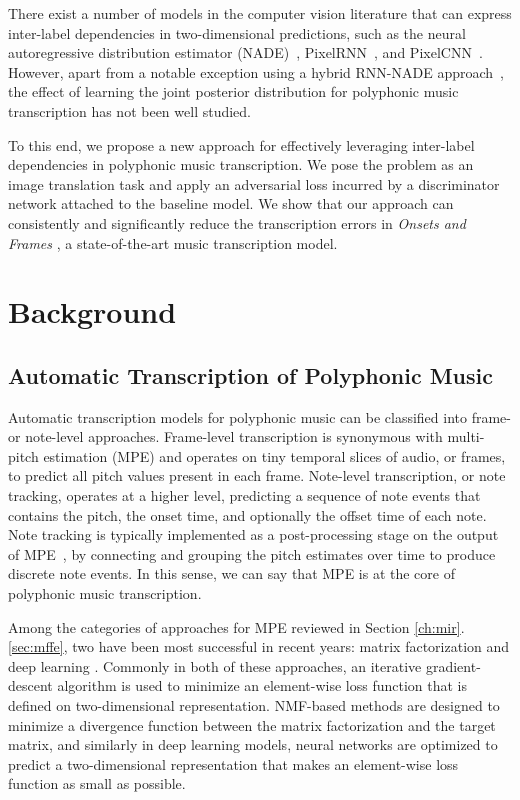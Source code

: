 There exist a number of models in the computer vision literature that can express inter-label dependencies in two-dimensional predictions, such as the neural autoregressive distribution estimator (NADE)~\cite{larochelle2011nade}, PixelRNN~\cite{oord2016pixelrnn}, and PixelCNN~\cite{oord2016pixelcnn}.
However, apart from a notable exception using a hybrid RNN-NADE approach~\cite{boulangerlewandowski2012temporal}, the effect of learning the joint posterior distribution for polyphonic music transcription has not been well studied.


To this end, we propose a new approach for effectively leveraging inter-label dependencies in polyphonic music transcription. We pose the problem as an image translation task and apply an adversarial loss incurred by a discriminator network attached to the baseline model.
We show that our approach can consistently and significantly reduce the transcription errors in \emph{Onsets and Frames} \cite{hawthorne2018onsetsframes}, a state-of-the-art music transcription model.


\section{Background}

\subsection{Automatic Transcription of Polyphonic Music}

Automatic transcription models for polyphonic music can be classified into frame- or note-level approaches.
Frame-level transcription is synonymous with multi-pitch estimation (MPE) and operates on tiny temporal slices of audio, or frames, to predict all pitch values present in each frame.
Note-level transcription, or note tracking, operates at a higher level, predicting a sequence of note events that contains the pitch, the onset time, and optionally the offset time of each note.
Note tracking is typically implemented as a post-processing stage on the output of MPE~\cite{benetos2019amt}, by connecting and grouping the pitch estimates over time to produce discrete note events.
In this sense, we can say that MPE is at the core of polyphonic music transcription.

Among the categories of approaches for MPE reviewed in Section \ref{ch:mir}.\ref{sec:mffe}, two have been most successful in recent years: matrix factorization \cite{lee2001nmf} and deep learning \cite{lecun2015deeplearning}.
Commonly in both of these approaches, an iterative gradient-descent algorithm is used to minimize an element-wise loss function that is defined on two-dimensional representation.
NMF-based methods are designed to minimize a divergence function between the matrix factorization and the target matrix, and similarly in deep learning models, neural networks are optimized to predict a two-dimensional representation that makes an element-wise loss function as small as possible.


